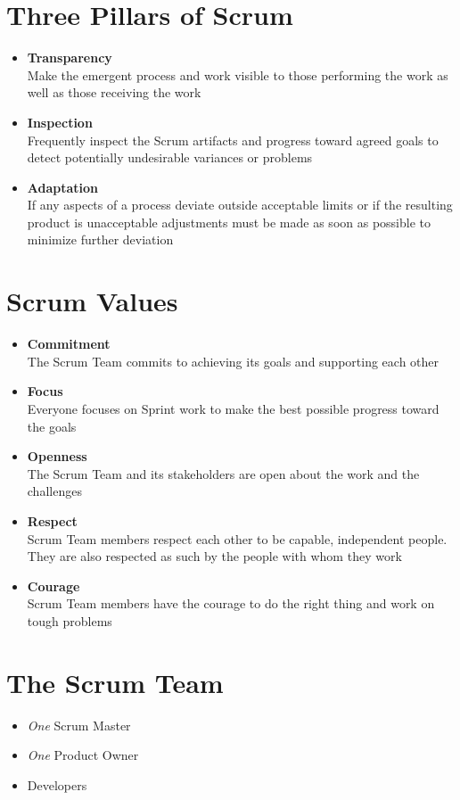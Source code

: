 \documentclass[a4paper,11pt,twocolumn]{article}
\begin{document}
\section*{Three Pillars of Scrum}
\begin{itemize}
	\item \textbf{Transparency}\\
	      Make the emergent process and work visible to those performing the work as well as those receiving the work
	\item \textbf{Inspection}\\
	      Frequently inspect the Scrum artifacts and progress toward agreed goals to detect potentially undesirable variances or problems
	\item \textbf{Adaptation}\\
	      If any aspects of a process deviate outside acceptable limits or if the resulting product is unacceptable adjustments must be made as soon as possible to minimize further deviation
\end{itemize}

\section*{Scrum Values}
\begin{itemize}
	\item \textbf{Commitment}\\
	      The Scrum Team commits to achieving its goals and supporting each other
	\item \textbf{Focus}\\
	      Everyone focuses on Sprint work to make the best possible progress toward the goals
	\item \textbf{Openness}\\
	      The Scrum Team and its stakeholders are open about the work and the challenges
	\item \textbf{Respect}\\
	      Scrum Team members respect each other to be capable, independent people. They are also respected as such by the people with whom they work
	\item \textbf{Courage}\\
	      Scrum Team members have the courage to do the right thing and work on tough problems
\end{itemize}

\section*{The Scrum Team}
\begin{itemize}
	\item \textit{One} Scrum Master
	\item \textit{One} Product Owner
	\item Developers
\end{itemize}
\end{document}
